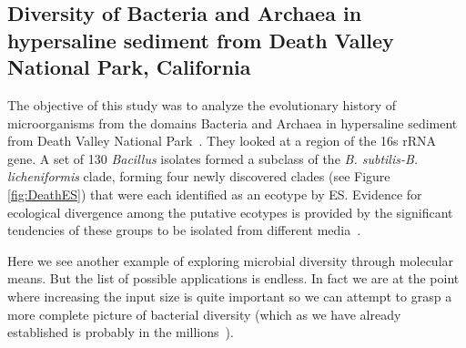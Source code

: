 \subsection*{Diversity of Bacteria and Archaea in hypersaline sediment from Death Valley National Park, California}
The objective of this study was to analyze the evolutionary history of microorganisms from the domains Bacteria and Archaea in hypersaline sediment from Death Valley National Park~\cite{kim2012diversity}. 
They looked at a region of the 16s rRNA gene.
A set of 130 \emph{Bacillus} isolates formed a subclass of the \emph{B. subtilis-B. licheniformis} clade, forming four newly discovered clades (see Figure \ref{fig:DeathES}) that were each identified as an ecotype by ES. Evidence for ecological divergence among the putative ecotypes is provided by the significant tendencies of these groups to be isolated from different media~\cite{kim2012diversity}.

Here we see another example of exploring microbial diversity through molecular means.
But the list of possible applications is endless.
In fact we are at the point where increasing the input size is quite important so we can attempt to grasp a more complete picture of bacterial diversity (which as we have already established is probably in the millions~\cite{cohan2008origins}).


